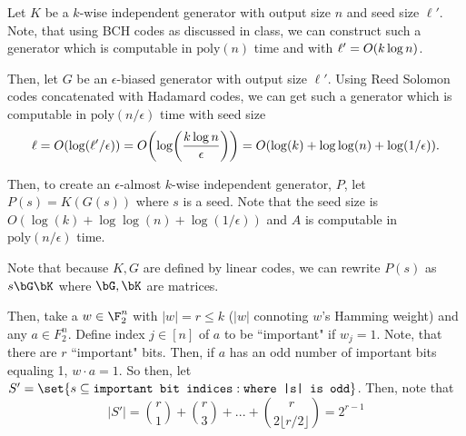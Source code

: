Let $K$ be a $k$-wise independent generator with output size $n$ and seed size $\ell'$.
Note, that using BCH codes as discussed in class, we can construct such a generator which is computable in $\text{poly}(n)$
time and with $\ell' = O\mleft(k \log n\mright)$.

Then, let $G$ be an $\epsilon$-biased generator with output size $\ell'$.
Using Reed Solomon codes concatenated with Hadamard codes, we can get such a generator
which is computable in $\text{poly}(n/\epsilon)$ time with seed size 
$$
	\ell = O\mleft(\log(\ell'/\epsilon)\mright) = O\mleft(
			\log \mleft(
				\frac{k \log n}{\epsilon}
			\mright)
		\mright) = O\mleft(
			\log(k) + \log\log(n) + \log(1/\epsilon)
		\mright).
$$


Then, to create an $\epsilon$-almost $k$-wise independent generator, $P$, 
let $P(s) = K(G(s))$ where $s$ is a seed. Note that the seed size is
$O(\log(k) + \log\log(n) + \log(1/\epsilon))$ and $A$ is computable in $\text{poly}(n/\epsilon)$ time.

Note that because $K, G$ are defined by linear codes, we can rewrite 
$P(s)$ as $s \bG \bK$ where $\bG, \bK$ are matrices.

Then, take a $w \in \F_2^n$ with $|w| = r \leq k$ ($|w|$ connoting $w$'s Hamming weight) and
any $a \in F_2^n$. Define index $j \in [n]$ of $a$ to be ``important" if $w_j = 1$.
Note, that there are $r$ ``important" bits. Then, if $a$ has an odd number of
important bits equaling 1, $w \cdot a = 1$.
So then, let 
$
	S' = \set{s \subseteq \texttt{important bit indices} : \texttt{where |s| is odd}}
$. Then, note that 
$$
	|S'| = \binom{r}{1} + \binom{r}{3} + ... + \binom{r}{2\lfloor r/2 \rfloor} = 2^{r - 1}
$$









